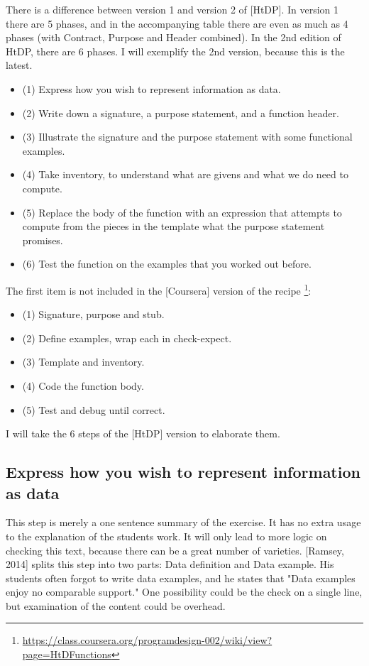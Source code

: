 \documentclass{article}
\begin{document}
There is a difference between version 1 and version 2 of [HtDP].
In version 1 there are 5 phases, and in the accompanying table there are even
as much as 4 phases (with Contract, Purpose and Header combined).
In the 2nd edition of HtDP, there are 6 phases.
I will exemplify the 2nd version, because this is the latest.

\begin{itemize}
 \item (1) Express how you wish to represent information as data.
 \item (2) Write down a signature, a purpose statement, and a function header.
 \item (3) Illustrate the signature and the purpose statement with some functional examples.
 \item (4) Take inventory, to understand what are givens and what we do need to compute.
 \item (5) Replace the body of the function with an expression that attempts to compute from the pieces in the template what the purpose statement promises.
 \item (6) Test the function on the examples that you worked out before.
\end{itemize}
 
 The first item is not included in the [Coursera] version of the recipe
 \footnote{\url{https://class.coursera.org/programdesign-002/wiki/view?page=HtDFunctions}}:
 
\begin{itemize}
  \item (1) Signature, purpose and stub.
  \item (2) Define examples, wrap each in check-expect.
  \item (3) Template and inventory.
  \item (4) Code the function body.
  \item (5) Test and debug until correct.
\end{itemize}

I will take the 6 steps of the [HtDP] version to elaborate them.

\subsection{Express how you wish to represent information as data}
This step is merely a one sentence summary of the exercise. It has no
extra usage to the explanation of the students work. It will only lead to more
logic on checking this text, because there can be a great number of varieties.
[Ramsey, 2014] splits this step into two parts: Data definition and Data example.
His students often forgot to write data examples, and he states that
"Data examples enjoy no comparable support."
One possibility could be the check on a single line, but examination of the
content could be overhead.
\end{document}
